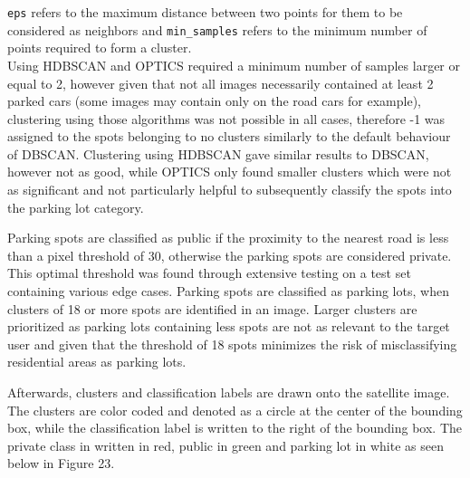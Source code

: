 \texttt{eps} refers to the maximum distance between two points for them to be
considered as neighbors and \texttt{min\_samples} refers to the minimum number
of points required to form a cluster.\\

Using HDBSCAN and OPTICS required a minimum number of samples larger or equal to
2, however given that not all images necessarily contained at least 2 parked
cars (some images may contain only on the road cars for example), clustering
using those algorithms was not possible in all cases, therefore -1 was assigned
to the spots belonging to no clusters similarly to the default behaviour of
DBSCAN. Clustering using HDBSCAN gave similar results to DBSCAN, however not as
good, while OPTICS only found smaller clusters which were not as significant and
not particularly helpful to subsequently classify the spots into the parking lot
category.

Parking spots are classified as public if the proximity to the nearest road is
less than a pixel threshold of 30, otherwise the parking spots are considered
private. This optimal threshold was found through extensive testing on a test
set containing various edge cases. Parking spots are classified as parking lots,
when clusters of 18 or more spots are identified in an image. Larger clusters
are prioritized as parking lots containing less spots are not as relevant to the
target user and given that the threshold of 18 spots minimizes the risk of
misclassifying residential areas as parking lots.

Afterwards, clusters and classification labels are drawn onto the satellite
image. The clusters are color coded and denoted as a circle at the center of the
bounding box, while the classification label is written to the right of the
bounding box. The private class in written in red, public in green and parking
lot in white as seen below in Figure 23.

